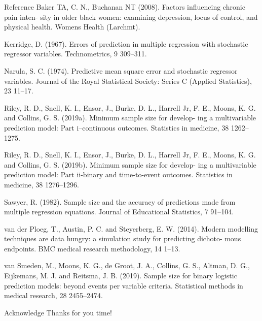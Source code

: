 \documentclass{beamer}
\begin{document}
\begin{frame}{Reference}
\scriptsize
Baker TA, C. N., Buchanan NT (2008). Factors influencing chronic pain inten- sity in older black women: examining depression, locus of control, and physical health. Womens Health (Larchmt).

Kerridge, D. (1967). Errors of prediction in multiple regression with stochastic regressor variables. Technometrics, 9 309–311.

Narula, S. C. (1974). Predictive mean square error and stochastic regressor variables. Journal of the Royal Statistical Society: Series C (Applied Statistics), 23 11–17.

Riley, R. D., Snell, K. I., Ensor, J., Burke, D. L., Harrell Jr, F. E., Moons, K. G. and Collins, G. S. (2019a). Minimum sample size for develop- ing a multivariable prediction model: Part i–continuous outcomes. Statistics in medicine, 38 1262–1275.

Riley, R. D., Snell, K. I., Ensor, J., Burke, D. L., Harrell Jr, F. E., Moons, K. G. and Collins, G. S. (2019b). Minimum sample size for develop- ing a multivariable prediction model: Part ii-binary and time-to-event outcomes. Statistics in medicine, 38 1276–1296.

Sawyer, R. (1982). Sample size and the accuracy of predictions made from multiple regression equations. Journal of Educational Statistics, 7 91–104.

van der Ploeg, T., Austin, P. C. and Steyerberg, E. W. (2014). Modern modelling techniques are data hungry: a simulation study for predicting dichoto- mous endpoints. BMC medical research methodology, 14 1–13.


van Smeden, M., Moons, K. G., de Groot, J. A., Collins, G. S., Altman, D. G., Eijkemans, M. J. and Reitsma, J. B. (2019). Sample size for binary logistic prediction models: beyond events per variable criteria. Statistical methods in medical research, 28 2455–2474.
\end{frame}

\begin{frame}{Acknowledge}
Thanks for you time!
\end{frame}
\end{document}
